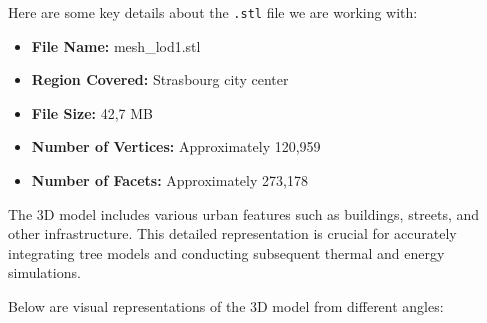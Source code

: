 \documentclass[12pt]{article}
\begin{document}
Here are some key details about the \texttt{.stl} file we are working with:
\begin{itemize}
    \item \textbf{File Name:} mesh\_lod1.stl
    \item \textbf{Region Covered:} Strasbourg city center
    \item \textbf{File Size:} 42,7 MB
    \item \textbf{Number of Vertices:} Approximately 120,959
    \item \textbf{Number of Facets:} Approximately 273,178
\end{itemize}

The 3D model includes various urban features such as buildings, streets, and
other infrastructure. This detailed representation is crucial for accurately
integrating tree models and conducting subsequent thermal and energy simulations.

Below are visual representations of the 3D model from different angles:
\end{document}
